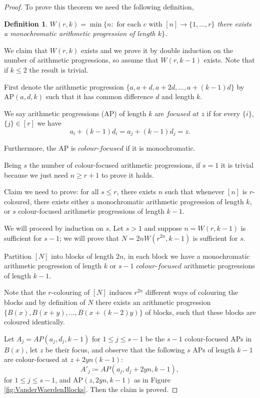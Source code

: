 \documentclass[12pt,twoside,a4paper,bibliography=totocnumbered]{book}
\numberwithin{equation}{section}
\newtheorem{definition}	[theorem] {Definition}
\theoremstyle{remark}
\begin{document}
\begin{proof}To prove this theorem we need the following definition,

\begin{definition}
$W(r,k) = \min \{n \colon \text{ for each } c \text{ with } [n] \rightarrow \{1,...,r\}$ there exists a monochromatic arithmetic  progression of length $k \}$.
\end{definition}
We claim that $W(r,k)$ exists and we prove it by double induction on the number of arithmetic progressions, so assume that $W(r, k-1)$ exists. Note that if $k \leq 2$ the result is trivial.

First denote the arithmetic progression $\{a, a + d, a +2d, ..., a+(k-1)d\}$ by AP$(a,d,k)$ such that it has common difference  $d$ and length $k$.

We say arithmetic progressions (AP) of length $k$ are $\textit{focused at}$ $z$ if for every $\{i\}$, $\{j\} \in [r]$ we have
$$ a_i +  (k-1)d_i = a_j  + (k-1) d_j = z .$$

Furthermore, the AP is $\textit{colour-focused}$ if it is monochromatic.

Being $s$ the number of colour-focused arithmetic progressions, if $s=1$ it is trivial because we just need $n \geq r+1$ to prove it holds.

Claim we need to prove: for all $s \leq r$, there exists $n$ such that whenever $[n]$ is $r$-coloured, there exists either a monochromatic arithmetic progression of length $k$, or $s$ colour-focused arithmetic progressions of length $k-1$.

We will proceed by induction on $s$. Let $s > 1$ and suppose $n=W(r,k-1)$ is sufficient for $s-1$; we will prove that $N=2n W(r^{2n},k-1)$ is sufficient for $s$.

Partition $[N]$ into blocks of length $2n$, in each block we have a monochromatic arithmetic progression of length $k$ or $s-1$ $\textit{colour-focused}$ arithmetic progressions of length $k-1$. 

Note that the $r$-colouring of $[N]$ induces $r^{2n}$ different ways of colouring the blocks and by definition of $N$ there exists an arithmetic progression $\{B(x), B(x+y), ... , B(x+(k-2)y)\}$ of blocks, such that these blocks are coloured identically.

Let $A_j = AP(a_j, d_j, k-1)$ for $1 \leq j \leq s-1$ be the $s-1$ colour-focused APs in $B(x)$, let $z$ be their focus, and observe that the following $s$ APs of length $k-1$ are colour-focused at $z+ 2yn(k-1) \colon$
$$ A'_j \coloneqq AP(a_j, d_j + 2yn, k-1) , $$
for $1 \leq j \leq s-1$, and AP$(z, 2yn, k-1)$ as in Figure \ref{fig:VanderWaerdenBlocks}. Then the claim is proved.


\end{proof}
\end{document}
